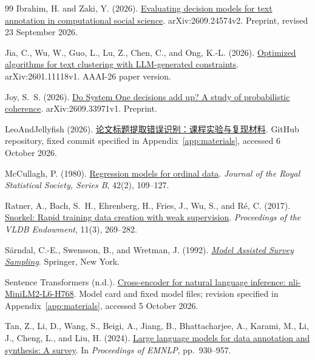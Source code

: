 \documentclass[UTF8,a4paper,zihao=-4,fontset=fandol]{ctexart}
\begin{document}
\begin{thebibliography}{99}
Ibrahim, H. and Zaki, Y. (2026).
\href{https://arxiv.org/abs/2609.24574v2}{Evaluating decision models for text annotation in computational social science}.
arXiv:2609.24574v2. Preprint, revised 23 September 2026.

Jia, C., Wu, W., Guo, L., Lu, Z., Chen, C., and Ong, K.-L. (2026).
\href{https://arxiv.org/abs/2601.11118v1}{Optimized algorithms for text clustering with LLM-generated constraints}.
arXiv:2601.11118v1. AAAI-26 paper version.

Joy, S.~S. (2026).
\href{https://arxiv.org/abs/2609.33971v1}{Do System One decisions add up? A study of probabilistic coherence}.
arXiv:2609.33971v1. Preprint.

LeoAndJellyfish (2026).
\href{https://github.com/LeoAndJellyfish/paper-title-error-classification/tree/1b0ce28d265454680b5b383bbb7ff0929dca688b}{论文标题提取错误识别：课程实验与复现材料}.
GitHub repository, fixed commit specified in Appendix~\ref{app:materials}, accessed 6 October 2026.

McCullagh, P. (1980).
\href{https://doi.org/10.1111/j.2517-6161.1980.tb01109.x}{Regression models for ordinal data}.
\emph{Journal of the Royal Statistical Society, Series B}, 42(2), 109--127.

Ratner, A., Bach, S.~H., Ehrenberg, H., Fries, J., Wu, S., and R{\'e}, C. (2017).
\href{https://doi.org/10.14778/3157794.3157797}{Snorkel: Rapid training data creation with weak supervision}.
\emph{Proceedings of the VLDB Endowment}, 11(3), 269--282.

S{\"a}rndal, C.-E., Swensson, B., and Wretman, J. (1992).
\href{https://link.springer.com/book/9780387406206}{\emph{Model Assisted Survey Sampling}}.
Springer, New York.

Sentence Transformers (n.d.).
\href{https://huggingface.co/cross-encoder/nli-MiniLM2-L6-H768}{Cross-encoder for natural language inference: nli-MiniLM2-L6-H768}.
Model card and fixed model files; revision specified in Appendix~\ref{app:materials}, accessed 5 October 2026.

Tan, Z., Li, D., Wang, S., Beigi, A., Jiang, B., Bhattacharjee, A., Karami, M., Li, J., Cheng, L., and Liu, H. (2024).
\href{https://doi.org/10.18653/v1/2024.emnlp-main.54}{Large language models for data annotation and synthesis: A survey}.
In \emph{Proceedings of EMNLP}, pp.~930--957.


\end{thebibliography}
\end{document}
